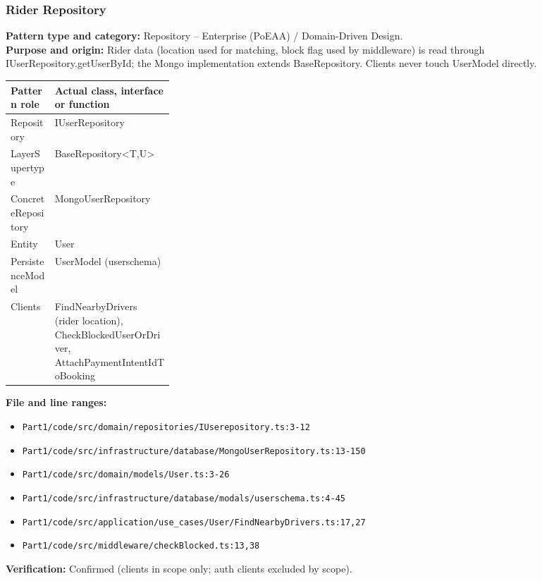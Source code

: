\documentclass[11pt,a4paper]{article}
\begin{document}
\subsubsection*{Rider Repository}
\textbf{Pattern type and category:} Repository -- Enterprise (PoEAA) / Domain-Driven Design.\\
\textbf{Purpose and origin:} Rider data (location used for matching, block flag used by middleware) is read through IUserRepository.getUserById; the Mongo implementation extends BaseRepository. Clients never touch UserModel directly.

\noindent\begin{tabularx}{\linewidth}{@{}P{0.27\linewidth}Y@{}}
\toprule Pattern role & Actual class, interface or function \\ \midrule
Repository & IUserRepository \\
LayerSupertype & BaseRepository\textless{}T,U\textgreater{} \\
ConcreteRepository & MongoUserRepository \\
Entity & User \\
PersistenceModel & UserModel (userschema) \\
Clients & FindNearbyDrivers (rider location), CheckBlockedUserOrDriver, AttachPaymentIntentIdToBooking \\
\bottomrule
\end{tabularx}

\noindent\textbf{File and line ranges:}\begin{itemize}\setlength\itemsep{0pt}\item \texttt{Part1/\allowbreak{}code/\allowbreak{}src/\allowbreak{}domain/\allowbreak{}repositories/\allowbreak{}IUserepository.\allowbreak{}ts:3-12}\item \texttt{Part1/\allowbreak{}code/\allowbreak{}src/\allowbreak{}infrastructure/\allowbreak{}database/\allowbreak{}MongoUserRepository.\allowbreak{}ts:13-150}\item \texttt{Part1/\allowbreak{}code/\allowbreak{}src/\allowbreak{}domain/\allowbreak{}models/\allowbreak{}User.\allowbreak{}ts:3-26}\item \texttt{Part1/\allowbreak{}code/\allowbreak{}src/\allowbreak{}infrastructure/\allowbreak{}database/\allowbreak{}modals/\allowbreak{}userschema.\allowbreak{}ts:4-45}\item \texttt{Part1/\allowbreak{}code/\allowbreak{}src/\allowbreak{}application/\allowbreak{}use\_\allowbreak{}cases/\allowbreak{}User/\allowbreak{}FindNearbyDrivers.\allowbreak{}ts:17,27}\item \texttt{Part1/\allowbreak{}code/\allowbreak{}src/\allowbreak{}middleware/\allowbreak{}checkBlocked.\allowbreak{}ts:13,38}\end{itemize}
\noindent\textbf{Verification:} Confirmed (clients in scope only; auth clients excluded by scope).
\end{document}
